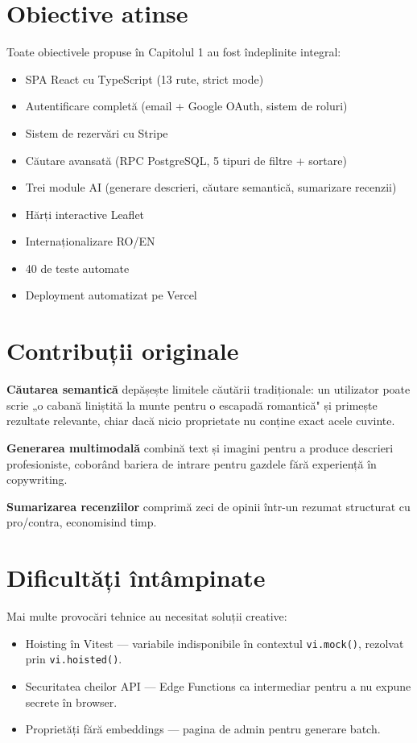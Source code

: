 \documentclass[12pt,a4paper,oneside]{report}
\begin{document}
\section{Obiective atinse}

Toate obiectivele propuse în Capitolul 1 au fost îndeplinite integral:

\begin{itemize}
  \item SPA React cu TypeScript (13 rute, strict mode)
  \item Autentificare completă (email + Google OAuth, sistem de roluri)
  \item Sistem de rezervări cu Stripe
  \item Căutare avansată (RPC PostgreSQL, 5 tipuri de filtre + sortare)
  \item Trei module AI (generare descrieri, căutare semantică, sumarizare recenzii)
  \item Hărți interactive Leaflet
  \item Internaționalizare RO/EN
  \item 40 de teste automate
  \item Deployment automatizat pe Vercel
\end{itemize}

\section{Contribuții originale}

\textbf{Căutarea semantică} depășește limitele căutării tradiționale: un utilizator poate scrie „o cabană liniștită la munte pentru o escapadă romantică" și primește rezultate relevante, chiar dacă nicio proprietate nu conține exact acele cuvinte.

\textbf{Generarea multimodală} combină text și imagini pentru a produce descrieri profesioniste, coborând bariera de intrare pentru gazdele fără experiență în copywriting.

\textbf{Sumarizarea recenziilor} comprimă zeci de opinii într-un rezumat structurat cu pro/contra, economisind timp.

\section{Dificultăți întâmpinate}

Mai multe provocări tehnice au necesitat soluții creative:

\begin{itemize}
  \item Hoisting în Vitest — variabile indisponibile în contextul \texttt{vi.mock()}, rezolvat prin \texttt{vi.hoisted()}.
  \item Securitatea cheilor API — Edge Functions ca intermediar pentru a nu expune secrete în browser.
  \item Proprietăți fără embeddings — pagina de admin pentru generare batch.
\end{itemize}
\end{document}
